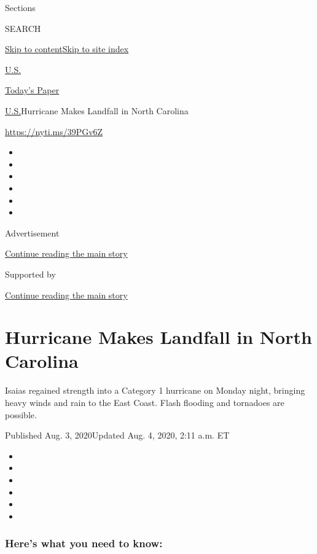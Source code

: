 Sections

SEARCH

\protect\hyperlink{site-content}{Skip to
content}\protect\hyperlink{site-index}{Skip to site index}

\href{https://www.nytimes.com/section/us}{U.S.}

\href{https://myaccount.nytimes.com/auth/login?response_type=cookie\&client_id=vi}{}

\href{https://www.nytimes.com/section/todayspaper}{Today's Paper}

\href{/section/us}{U.S.}\textbar{}Hurricane Makes Landfall in North
Carolina

\url{https://nyti.ms/39PGv6Z}

\begin{itemize}
\item
\item
\item
\item
\item
\item
\end{itemize}

Advertisement

\protect\hyperlink{after-top}{Continue reading the main story}

Supported by

\protect\hyperlink{after-sponsor}{Continue reading the main story}

\hypertarget{hurricane-makes-landfall-in-north-carolina}{%
\section{Hurricane Makes Landfall in North
Carolina}\label{hurricane-makes-landfall-in-north-carolina}}

Isaias regained strength into a Category 1 hurricane on Monday night,
bringing heavy winds and rain to the East Coast. Flash flooding and
tornadoes are possible.

Published Aug. 3, 2020Updated Aug. 4, 2020, 2:11 a.m. ET

\begin{itemize}
\item
\item
\item
\item
\item
\item
\end{itemize}

\hypertarget{heres-what-you-need-to-know}{%
\subsubsection{Here's what you need to
know:}\label{heres-what-you-need-to-know}}


